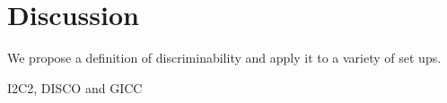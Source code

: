 \documentclass{article}
\begin{document}
\section{Discussion}

 We propose a definition of discriminability and apply it to a variety of set ups.

 I2C2, DISCO and GICC




% 
% 
% 
% 
% 
% 
% 
% 



\appendix






\newpage
\small{


}
\end{document}
